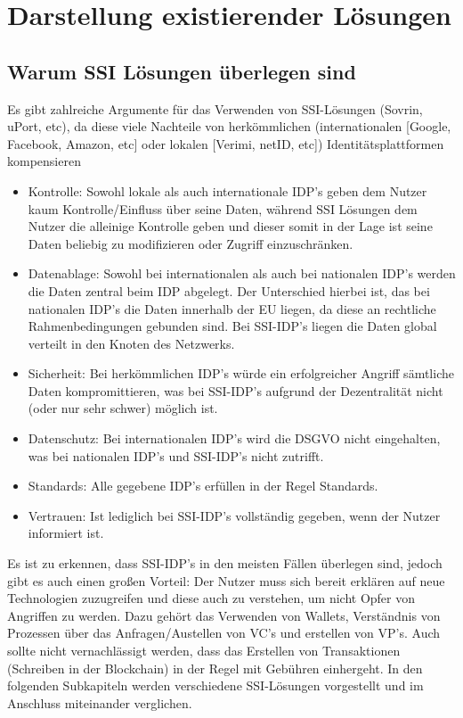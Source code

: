 \chapter{Darstellung existierender Lösungen}
\label{cha:existierende Lösungen}

\section{Warum SSI Lösungen überlegen sind}
Es gibt zahlreiche Argumente für das Verwenden von SSI-Lösungen (Sovrin, uPort, etc), da diese viele Nachteile von herkömmlichen (internationalen [Google, Facebook, Amazon, etc] oder lokalen [Verimi, netID, etc]) Identitätsplattformen kompensieren \cite{ID28}

\begin{itemize}
	\item Kontrolle: Sowohl lokale als auch internationale IDP's geben dem Nutzer kaum Kontrolle/Einfluss über seine Daten, während SSI Lösungen dem Nutzer die alleinige Kontrolle geben und dieser somit in der Lage ist seine Daten beliebig zu modifizieren oder Zugriff einzuschränken.
	
	\item Datenablage: Sowohl bei internationalen als auch bei nationalen IDP's werden die Daten zentral beim IDP abgelegt. Der Unterschied hierbei ist, das bei nationalen IDP's die Daten innerhalb der EU liegen, da diese an rechtliche Rahmenbedingungen gebunden sind. Bei SSI-IDP's liegen die Daten global verteilt in den Knoten des Netzwerks.
	
	\item Sicherheit: Bei herkömmlichen IDP's würde ein erfolgreicher Angriff sämtliche Daten kompromittieren, was bei SSI-IDP's aufgrund der Dezentralität nicht (oder nur sehr schwer) möglich ist.
	
	\item Datenschutz: Bei internationalen IDP's wird die DSGVO nicht eingehalten, was bei nationalen IDP's und SSI-IDP's nicht zutrifft.

	\item Standards: Alle gegebene IDP's erfüllen in der Regel Standards.
	
	\item Vertrauen: Ist lediglich bei SSI-IDP's vollständig gegeben, wenn der Nutzer informiert ist.  
\end{itemize}

Es ist zu erkennen, dass SSI-IDP's in den meisten Fällen überlegen sind, jedoch gibt es auch einen großen Vorteil: Der Nutzer muss sich bereit erklären auf neue Technologien zuzugreifen und diese auch zu verstehen, um nicht Opfer von Angriffen zu werden. Dazu gehört das Verwenden von Wallets, Verständnis von Prozessen über das Anfragen/Austellen von VC's und erstellen von VP's. Auch sollte nicht vernachlässigt werden, dass das Erstellen von Transaktionen (Schreiben in der Blockchain) in der Regel mit Gebühren einhergeht. In den folgenden Subkapiteln werden verschiedene SSI-Lösungen vorgestellt und im Anschluss miteinander verglichen.



